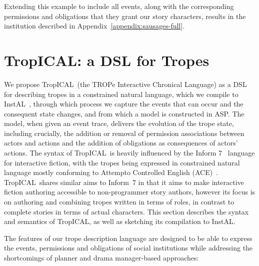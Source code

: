 \documentclass[11pt]{report}
\def\tropical{TropICAL}
\begin{document}
Extending this example to include all events, along with the corresponding
permissions and obligations that they grant our story characters, results in the
institution described in Appendix~\ref{appendix:sausages-full}.

\section{TropICAL: a DSL for Tropes} %
\label{sec:tropical}

We propose \tropical\ (the TROPe Interactive Chronical Language) as a DSL for describing tropes in a constrained natural language, which we compile to InstAL~\citep{cliffe2007specifying}, through which process we capture the events that can occur and the consequent state changes, and from which a model is constructed in ASP.  The model, when given an event trace, delivers the evolution of the trope state, including crucially, the addition or removal of permission associations between actors and actions and the addition of obligations as consequences of actors' actions.  The syntax of \tropical\ is heavily influenced by the Inform 7~\citep{reed2010creating} language for interactive fiction, with the tropes being expressed in constrained natural language mostly conforming to Attempto Controlled English (ACE)~\citep{fuchs1996attempto}. \tropical\ shares similar aims to Inform~7 in that it aims to make interactive fiction authoring accessible to non-programmer story authors, however its focus is on authoring and combining tropes written in terms of roles, in contrast to complete stories in terms of actual characters. This section describes the syntax and semantics of \tropical, as well as sketching its compilation to InstAL.

The features of our trope description language are designed to be able to express the events, permissions and obligations of social institutions while addressing the shortcomings of planner and drama manager-based approaches:
\end{document}
